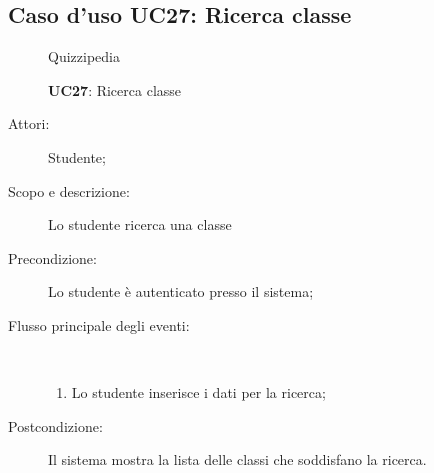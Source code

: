 \subsection{Caso d'uso UC27: Ricerca classe}
	\begin{figure}[H]
		\centering
		\begin{resizedtikzpicture}{\textwidth}
		\begin{umlsystem}[x=0, fill=lightgray!20]{Quizzipedia}
		\end{umlsystem}
		\end{resizedtikzpicture}
		\caption{\textbf{UC27}: Ricerca classe}
		\label{UC27}
	\end{figure}
\begin{description}
\item[Attori:] Studente;
\item[Scopo e descrizione:] Lo studente ricerca una classe
      \item[Precondizione:] Lo studente è autenticato presso il sistema;

        \item[Flusso principale degli eventi:] \ 
 \begin{enumerate}
          \item Lo studente inserisce i dati per la ricerca;

      \end{enumerate}
    \item[Postcondizione:] Il sistema mostra la lista delle classi che soddisfano la ricerca.
  \end{description}
\hypertarget{UC28}{}
